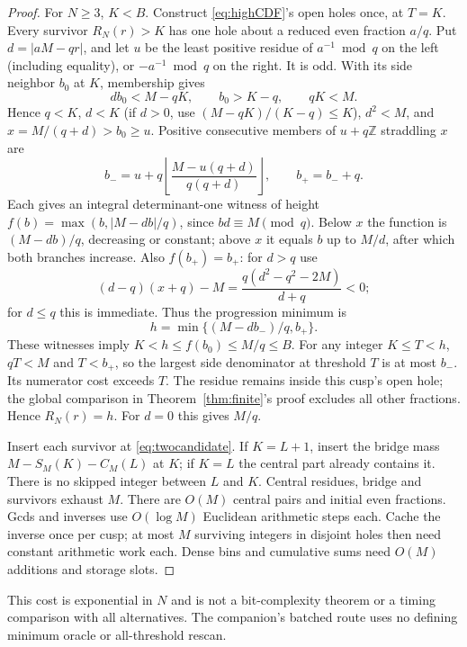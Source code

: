 \documentclass[11pt,a4paper]{article}
\numberwithin{equation}{section}
\theoremstyle{remark}
\newcommand{\Z}{\mathbb Z}
\begin{document}
\begin{proof}
For $N\ge3$, $K<B$. Construct \eqref{eq:highCDF}'s open holes once,
at $T=K$. Every survivor $R_N(r)>K$ has one hole about a reduced
even fraction $a/q$. Put $d=|aM-qr|$, and let $u$ be the least
positive residue of $a^{-1}\bmod q$ on the left (including equality),
or $-a^{-1}\bmod q$ on the right. It is odd. With its side neighbor
$b_0$ at $K$, membership gives
\[
db_0<M-qK,\qquad b_0>K-q,\qquad qK<M.
\]
Hence $q<K$, $d<K$ (if $d>0$, use $(M-qK)/(K-q)\le K$),
$d^2<M$, and $x=M/(q+d)>b_0\ge u$.
Positive consecutive members of $u+q\Z$ straddling $x$ are
\[
b_-=u+q\left\lfloor\frac{M-u(q+d)}{q(q+d)}\right\rfloor,
\qquad b_+=b_-+q.
\]
Each gives an integral determinant-one witness of height
$f(b)=\max(b,|M-db|/q)$, since $bd\equiv M\pmod q$.
Below $x$ the function is $(M-db)/q$, decreasing or constant;
above $x$ it equals $b$ up to $M/d$, after which both branches
increase. Also $f(b_+)=b_+$: for $d>q$ use
\[
(d-q)(x+q)-M=\frac{q(d^2-q^2-2M)}{d+q}<0;
\]
for $d\le q$ this is immediate. Thus the progression minimum is
\begin{equation}\label{eq:twocandidate}
h=\min\{(M-db_-)/q,b_+\}.
\end{equation}
These witnesses imply $K<h\le f(b_0)\le M/q\le B$.
For any integer $K\le T<h$, $qT<M$ and $T<b_+$, so the largest
side denominator at threshold $T$ is at most $b_-$. Its numerator
cost exceeds $T$. The residue remains inside this cusp's open hole;
the global comparison in Theorem~\ref{thm:finite}'s proof excludes
all other fractions. Hence $R_N(r)=h$. For $d=0$ this gives $M/q$.

Insert each survivor at \eqref{eq:twocandidate}. If $K=L+1$, insert
the bridge mass $M-S_M(K)-C_M(L)$ at $K$; if $K=L$ the central
part already contains it. There is no skipped integer between $L$
and $K$. Central residues, bridge and survivors exhaust $M$.
There are $O(M)$ central pairs and initial even fractions.
Gcds and inverses use $O(\log M)$ Euclidean arithmetic steps each.
Cache the inverse once per cusp; at most $M$ surviving integers in
disjoint holes then need constant arithmetic work each. Dense bins
and cumulative sums need $O(M)$ additions and storage slots.
\end{proof}
This cost is exponential in $N$ and is not a bit-complexity theorem or
a timing comparison with all alternatives. The companion's batched
route uses no defining minimum oracle or all-threshold rescan.
\end{document}
